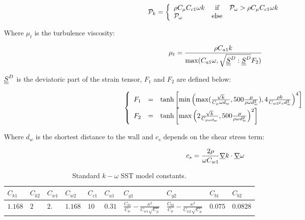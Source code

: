 \begin{equation}
\mathcal{P}_k = \left\{
\begin{array}{l c r}
\rho C_{\mu} C_{c1} \omega k & \text{if} & \mathcal{P}_{\omega} > \rho C_{\mu}  C_{c1}\omega k\\
\mathcal{P}_{\omega} & \text{else} & \\
\end{array}
\right.
\end{equation}

Where $\mu_t$ is the turbulence viscosity:

\begin{equation}
\mu_t = \frac{\rho C_{a1} k}{\max(C_{a1} \omega, \sqrt{\underline{\underline{S}}^D:\underline{\underline{S}}^D}F_2)}
\end{equation}

$\underline{\underline{S}}^D$ is the deviatoric part of the strain tensor, $F_1$ and $F_2$ are defined below:

\begin{equation}
\left\{
\begin{array}{r c l}
F_1 & = & \tanh\left[\min\left(\max(\frac{\sqrt{k}}{C_{\mu}\omega d_w}, 500\frac{\mu}{\rho \omega d_w^2}), 4\frac{\rho k}{C_{w2} c_{s} d_w^2}\right)^4\right]\\
F_2 & = & \tanh\left[\max\left(2\frac{\sqrt{k}}{C_{\mu \omega d_w}}, 500\frac{\mu}{\rho \omega d_w^2}\right)^2\right]\\
\end{array}
\right.
\end{equation}

Where $d_w$ is the shortest distance to the wall and $c_s$ depends on the shear stress term:

\begin{equation}
c_s = \frac{2\rho}{\omega C_{w1}} \underline{\nabla}{k} \cdot \underline{\nabla}{\omega}
\end{equation}

\begin{table}[!htp]
\centering
\begin{tabular}{p{1cm}|p{1cm}|p{1cm}|p{1cm}|p{1cm}|p{1cm}|p{2.5cm}|p{2.5cm}|p{1cm}|p{1cm}}
$C_{k1}$ & $C_{k2}$ & $C_{w1}$ & $C_{w2}$ & $C_{c1}$ & $C_{a1}$ & $C_{g1}$ & $C_{g2}$ & $C_{b1}$ & $C_{b2}$ \\ \hline
$1.168$ & $2$ & $2.$ & $1.168$ & $10$ & $0.31$ & $\frac{C_{b1}}{C_{\mu}}-\frac{\kappa^2}{C_{w1}\sqrt{C_{\mu}}}$ & $\frac{C_{b2}}{C_{\mu}}-\frac{\kappa^2}{C_{w2}\sqrt{C_{\mu}}}$ & $0.075$ & $0.0828$
\end{tabular}%
\caption{Standard $k-\omega$ SST model constants.
\label{tab:k_omega_constants}}
\end{table}

